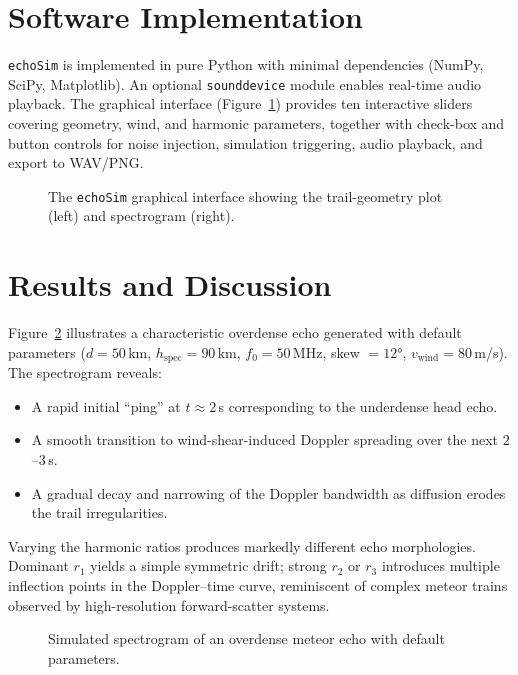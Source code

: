 \documentclass[a4paper,11pt]{article}
\begin{document}
\section{Software Implementation}

\texttt{echoSim} is implemented in pure Python with minimal dependencies (NumPy, SciPy, Matplotlib). An optional \texttt{sounddevice} module enables real-time audio playback. The graphical interface (Figure~\ref{fig:gui}) provides ten interactive sliders covering geometry, wind, and harmonic parameters, together with check-box and button controls for noise injection, simulation triggering, audio playback, and export to WAV/PNG.

\begin{figure}[htbp]
    \centering
    \caption{The \texttt{echoSim} graphical interface showing the trail-geometry plot (left) and spectrogram (right).}
    \label{fig:gui}
\end{figure}

\section{Results and Discussion}

Figure~\ref{fig:spec} illustrates a characteristic overdense echo generated with default parameters ($d=50\,$km, $h_{\mathrm{spec}}=90\,$km, $f_0=50\,$MHz, skew $=12°$, $v_{\mathrm{wind}}=80\,$m/s). The spectrogram reveals:
\begin{itemize}
    \item A rapid initial ``ping'' at $t\approx 2\,$s corresponding to the underdense head echo.
    \item A smooth transition to wind-shear-induced Doppler spreading over the next $2$--$3\,$s.
    \item A gradual decay and narrowing of the Doppler bandwidth as diffusion erodes the trail irregularities.
\end{itemize}

Varying the harmonic ratios produces markedly different echo morphologies. Dominant $r_1$ yields a simple symmetric drift; strong $r_2$ or $r_3$ introduces multiple inflection points in the Doppler--time curve, reminiscent of complex meteor trains observed by high-resolution forward-scatter systems.

\begin{figure}[htbp]
    \centering
    \caption{Simulated spectrogram of an overdense meteor echo with default parameters.}
    \label{fig:spec}
\end{figure}
\end{document}
